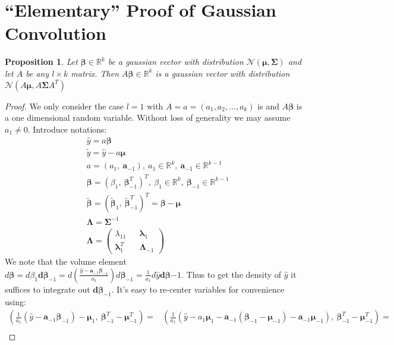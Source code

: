 \documentclass[10pt,fleqn]{amsart}
\newtheorem{proposition}[theorem]{Proposition}
\theoremstyle{definition}
\theoremstyle{remark}
\numberwithin{equation}{section}
\newcommand{\aaa}{\boldsymbol{a}}
\newcommand{\RR}{\mathbb{R}}
\newcommand{\bbeta}{\boldsymbol{\beta}}
\newcommand{\mmu}{\boldsymbol{\mu}}
\newcommand{\SSigma}{\boldsymbol{\Sigma}}
\newcommand{\llambda}{\boldsymbol{\lambda}}
\newcommand{\LLambda}{\boldsymbol{\Lambda}}
\newcommand{\bbetatilde}{\widetilde{\bbeta}}
\newcommand{\yhat}{\widehat{y}}
\newcommand{\ytilde}{\widetilde{y}}
\begin{document}
\appendix\section{``Elementary'' Proof of Gaussian Convolution}\label{appendix_gauss_conv}
\begin{proposition}
    Let $\bbeta\in\RR^k$ be a gaussian vector with distribution $\mathcal{N}(\mmu,\SSigma)$ and let $A$ be any $l\times k$ matrix.
    Then $A\bbeta\in\RR^k$ is a gaussian vector with distribution $\mathcal{N}(A\mmu,A\SSigma A^T)$
\end{proposition}
\begin{proof} We only consider the case $l=1$ with $A=a=(a_1, a_2,\ldots, a_k)$ is and $A\bbeta$ is a one dimensional random variable.
Without loss of generality we may assume $a_1\neq 0$. Introduce notations:
\begin{align}
    &\yhat = a\bbeta\\
    &\ytilde=\yhat-a\mmu\\
    &a = \left(a_1,\ \aaa_{-1}\right),\ a_1\in\RR^k,\ \aaa_{-1}\in\RR^{k-1}\\
    &\bbeta = \left(\beta_1,\ \bbeta_{-1}^T\right)^T,\ \beta_1\in\RR^k,\ \bbeta_{-1}\in\RR^{k-1}\\
    &\bbetatilde=\left(\bbetatilde_1,\ \bbetatilde_{-1}^T\right)^T=\bbeta-\mmu\\
    &\LLambda=\SSigma^{-1}\\
    &\LLambda=\left(\begin{matrix}
        \lambda_{11} && \llambda_1\\
        \llambda_1^T && \LLambda_{-1}
    \end{matrix}\right)
\end{align}
We note that the volume element
$\displaystyle d\bbeta=d\beta_1\boldsymbol{d}\bbeta_{-1}=d\left(\frac{\yhat-\aaa_{-1}\bbeta_{-1}}{a_1}\right)d\bbeta_{-1}=\frac 1{a_1}d\yhat\boldsymbol{d}\bbeta{-1}$.
Thus to get the density of $\yhat$ it suffices to integrate out $\boldsymbol{d}\bbeta_{-1}$. It's easy to re-center variables for convenience using:
\begin{equation*}\begin{split}
    \left(\frac{1}{a_1}\left(\yhat-\aaa_{-1}\bbeta_{-1}\right)-\mmu_1,\ \bbeta_{-1}^T-\mmu_{-1}^T\right)=&\left(\frac{1}{a_1}\left(\yhat-a_1\mmu_1-\aaa_{-1}\left(\bbeta_{-1}-\mmu_{-1}\right)-\aaa_{-1}\mmu_{-1}\right),\ \bbeta_{-1}^T-\mmu_{-1}^T\right)=\\

\end{split}
\end{equation*}
\end{proof}
\end{document}
